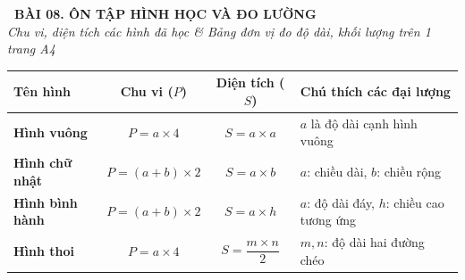 \documentclass[14pt,a4paper,oneside]{extbook}
\begin{document}
\noindent
\begin{tcolorbox}[
  enhanced,
  colback=teal!8!white,
  colframe=teal!80!black,
  arc=3mm,
  boxrule=1.1pt,
  width=\linewidth,
  halign=center,
  top=2.2mm, bottom=2.2mm,
  left=3mm, right=3mm,
  drop fuzzy shadow
]
  {\large\bfseries\color{teal!95!black}\faBookmark\ BÀI 08. ÔN TẬP HÌNH HỌC VÀ ĐO LƯỜNG}\\[2pt]
  {\scriptsize\color{black!75}\itshape Chu vi, diện tích các hình đã học & Bảng đơn vị đo độ dài, khối lượng trên 1 trang A4}
\end{tcolorbox}

\vspace{3.2mm}
\noindent
\begin{tcolorbox}[
  enhanced,
  title={\footnotesize\bfseries\color{white}\faShapes\ 1. Bảng tổng hợp Chu vi và Diện tích các hình phẳng},
  colback=blue!2!white,
  colframe=blue!75!black,
  arc=2.5mm, boxrule=0.8pt, top=1.8mm, bottom=1.8mm, left=2mm, right=2mm
]
  \scriptsize
  \centering
  \begin{tabular}{|l|c|c|l|}
    \hline
    \textbf{Tên hình} & \textbf{Chu vi ($P$)} & \textbf{Diện tích ($S$)} & \textbf{Chú thích các đại lượng} \\ \hline
    \textbf{Hình vuông} & $P = a \times 4$ & $S = a \times a$ & $a$ là độ dài cạnh hình vuông \\ \hline
    \textbf{Hình chữ nhật} & $P = (a + b) \times 2$ & $S = a \times b$ & $a$: chiều dài, $b$: chiều rộng \\ \hline
    \textbf{Hình bình hành} & $P = (a + b) \times 2$ & $S = a \times h$ & $a$: độ dài đáy, $h$: chiều cao tương ứng \\ \hline
    \textbf{Hình thoi} & $P = a \times 4$ & $S = \dfrac{m \times n}{2}$ & $m, n$: độ dài hai đường chéo \\ \hline
  \end{tabular}
\end{tcolorbox}

\vspace{3mm}
\end{document}
